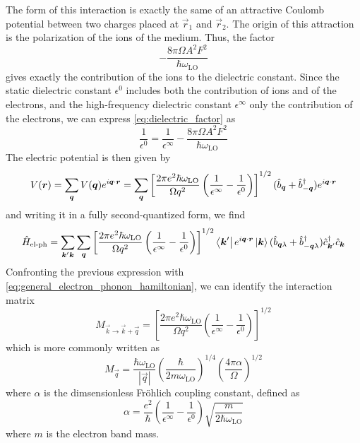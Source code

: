 The form of this interaction is exactly the same of an attractive Coulomb potential between two charges placed at $\vec{r}_1$ and $\vec{r}_2$. The origin of this attraction is the polarization of the ions of the medium. Thus, the factor
\begin{equation} \label{eq:dielectric_factor}
    - \frac{8\pi \Omega A^2 F^2}{\hbar \omega_\text{LO}}
\end{equation}
gives exactly the contribution of the ions to the dielectric constant. Since the static dielectric constant $\epsilon^0$ includes both the contribution of ions and of the electrons, and the high-frequency dielectric constant $\epsilon^\infty$ only the contribution of the electrons, we can express \cref{eq:dielectric_factor} as
\begin{equation}
    \frac{1}{\epsilon^0} = \frac{1}{\epsilon^\infty} - \frac{8\pi \Omega A^2 F^2}{\hbar \omega_\text{LO}}
\end{equation}
The electric potential is then given by
\begin{equation}
    V(\mathbf{\boldsymbol{r}}) = \sum_{\mathbf{\boldsymbol{q}}} V(\mathbf{\boldsymbol{q}}) e^{i\mathbf{\boldsymbol{q}} \cdot \mathbf{\boldsymbol{r}}}
    =  \sum_{\mathbf{\boldsymbol{q}}} \left[ \frac{2\pi e^2 \hbar \omega_\text{LO}}{\Omega q^2} \left( \frac{1}{\epsilon^\infty} - \frac{1}{\epsilon^0} \right) \right]^{1/2} (\hat{b}_{\mathbf{\boldsymbol{q}}} + \hat{b}^\dagger_{-\mathbf{\boldsymbol{q}}}) e^{i\mathbf{\boldsymbol{q}}\cdot\mathbf{\boldsymbol{r}}}
\end{equation}
and writing it in a fully second-quantized form, we find
\begin{equation} \label{eq:frohlich_hamiltonian}
    \hat{H}_\text{el-ph} =  \sum_{\mathbf{\boldsymbol{k}}'\mathbf{\boldsymbol{k}}} \sum_{\mathbf{\boldsymbol{q}}} \left[ \frac{2\pi e^2 \hbar \omega_\text{LO}}{\Omega q^2} \left( \frac{1}{\epsilon^\infty} - \frac{1}{\epsilon^0} \right) \right]^{1/2} \bra{\mathbf{\boldsymbol{k}}'}e^{i\mathbf{\boldsymbol{q}}\cdot\mathbf{\boldsymbol{r}}}\ket{\mathbf{\boldsymbol{k}}}(\hat{b}_{\mathbf{\boldsymbol{q}}\lambda} + \hat{b}^\dagger_{-\mathbf{\boldsymbol{q}}\lambda}) \hat{c}^\dagger_{\mathbf{\boldsymbol{k}}'}\hat{c}_{\mathbf{\boldsymbol{k}}}
\end{equation}
Confronting the previous expression with \cref{eq:general_electron_phonon_hamiltonian}, we can identify the interaction matrix
\begin{equation}
    M_{\vec{k} \rightarrow \vec{k} + \vec{q}} =  \left[ \frac{2\pi e^2 \hbar \omega_\text{LO}}{\Omega q^2} \left( \frac{1}{\epsilon^\infty} - \frac{1}{\epsilon^0} \right) \right]^{1/2}
\end{equation}
which is more commonly written as
\begin{equation} \label{eq:frohlich_matrix}
    M_\vec{q} =  \frac{\hbar \omega_\text{LO}}{|\vec{q}|} \left(\frac{\hbar}{2m\omega_\text{LO}}\right)^{1/4} \left(\frac{4\pi\alpha}{\Omega}\right)^{1/2}
\end{equation}
where $\alpha$ is the dimsensionless Fr\"{o}hlich coupling constant,  defined as
\begin{equation}
    \alpha = \frac{e^2}{\hbar} \left( \frac{1}{\epsilon^\infty} - \frac{1}{\epsilon^0} \right) \sqrt{\frac{m}{2\hbar\omega_\text{LO}}}
\end{equation}
where $m$ is the electron band mass.

